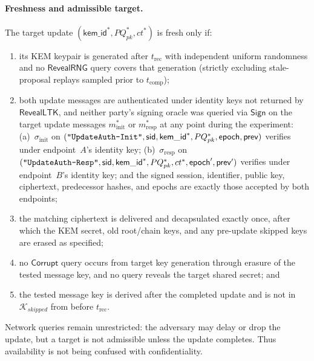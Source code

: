 \documentclass[11pt,a4paper]{article}
\theoremstyle{remark}
\theoremstyle{plain}
\newcommand{\strlit}[1]{\text{\upshape\texttt{"#1"}}}
\begin{document}
\paragraph{Freshness and admissible target.}
The target update $(\mathsf{kem\_id}^*,PQ_{pk}^*,ct^*)$ is fresh only if:
\begin{enumerate}
  \item its KEM keypair is generated after $t_{\mathrm{rec}}$ with independent uniform
        randomness and no $\mathsf{RevealRNG}$ query covers that generation (strictly excluding stale-proposal replays sampled prior to $t_{\mathrm{comp}}$);
  \item both update messages are authenticated under identity keys not returned by
        $\mathsf{RevealLTK}$, and neither party's signing oracle was queried via $\mathsf{Sign}$ on the
        target update messages $m_{\mathrm{init}}^*$ or $m_{\mathrm{resp}}^*$ at any point during the experiment:
        (a)~$\sigma_{\mathrm{init}}$ on
        $(\strlit{UpdateAuth-Init}, \allowbreak \mathsf{sid}, \allowbreak \mathsf{kem\_id}^*, \allowbreak PQ_{pk}^*, \allowbreak \mathsf{epoch}, \allowbreak \mathsf{prev})$
        verifies under endpoint~$A$'s identity key;
        (b)~$\sigma_{\mathrm{resp}}$ on
        $(\strlit{UpdateAuth-Resp}, \allowbreak \mathsf{sid}, \allowbreak \mathsf{kem\_id}^*, \allowbreak PQ_{pk}^*, \allowbreak ct^*, \allowbreak \mathsf{epoch}', \allowbreak \mathsf{prev}')$
        verifies under endpoint~$B$'s identity key;
        and the signed session, identifier, public key, ciphertext, predecessor hashes, and epochs
        are exactly those accepted by both endpoints;
  \item the matching ciphertext is delivered and decapsulated exactly once, after which the
        KEM secret, old root/chain keys, and any pre-update skipped keys are erased as specified;
  \item no $\mathsf{Corrupt}$ query occurs from target key generation through erasure of the
        tested message key, and no query reveals the target shared secret; and
  \item the tested message key is derived after the completed update and is not in
        $\mathcal{K}_{skipped}$ from before $t_{\mathrm{rec}}$.
\end{enumerate}
Network queries remain unrestricted: the adversary may delay or drop the update, but a target
is not admissible unless the update completes.  Thus availability is not being confused with
confidentiality.
\end{document}
